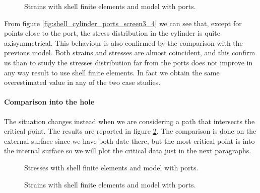\documentclass[a4paper,12pt]{article}
\begin{document}
\begin{figure}[h]
\centering     %
\caption{Strains with shell finite elements and model with ports.}
\label{fig:shellmodel2strain}
\end{figure}


From figure \ref{fig:shell_cylinder_ports_screen3_4} we can see that, except for points close to the port, the stress distribution in the cylinder is quite axisymmetrical.
This behaviour is also confirmed by the comparison with the previous model. Both strains and stresses are almost coincident, and this confirm us than to study the stresses distribution far from the ports does not improve in any way result to use shell finite elements. In fact we obtain the same overestimated value in any of the two case studies.
\paragraph*{Comparison into the hole}
The situation changes instead when we are considering a path that intersects the critical point. The results are reported in figure \ref{fig:shellmodel2stress_portspath}.
The comparison is done on the external surface since we have both date there, but the most critical point is into the internal surface so we will plot the critical data just in the next paragraphs.

\begin{figure}[H]
\centering     %
\caption{Stresses with shell finite elements and model with ports.}
\label{fig:shellmodel2stress_portspath}
\end{figure}

\begin{figure}[H]
\centering     %
\caption{Strains with shell finite elements and model with ports.}
\label{fig:shellmodel2strain_portspath}
\end{figure}
\end{document}
